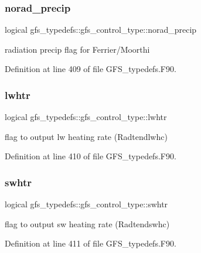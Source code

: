 \subsubsection{norad\+\_\+precip}
{\footnotesize\ttfamily logical gfs\+\_\+typedefs\+::gfs\+\_\+control\+\_\+type\+::norad\+\_\+precip}



radiation precip flag for Ferrier/\+Moorthi 



Definition at line 409 of file G\+F\+S\+\_\+typedefs.\+F90.

\mbox{\label{structgfs__typedefs_1_1gfs__control__type_a2790711a8b2b7e9ad76510a5dfcfe8fe}} 
\subsubsection{lwhtr}
{\footnotesize\ttfamily logical gfs\+\_\+typedefs\+::gfs\+\_\+control\+\_\+type\+::lwhtr}



flag to output lw heating rate (Radtendlwhc) 



Definition at line 410 of file G\+F\+S\+\_\+typedefs.\+F90.

\mbox{\label{structgfs__typedefs_1_1gfs__control__type_a4afc7f8c77a53712245717e8da707f97}} 
\subsubsection{swhtr}
{\footnotesize\ttfamily logical gfs\+\_\+typedefs\+::gfs\+\_\+control\+\_\+type\+::swhtr}



flag to output sw heating rate (Radtendswhc) 



Definition at line 411 of file G\+F\+S\+\_\+typedefs.\+F90.

\mbox{\label{structgfs__typedefs_1_1gfs__control__type_a7c4b13fd74117266cc92de88bb2f9960}} 

